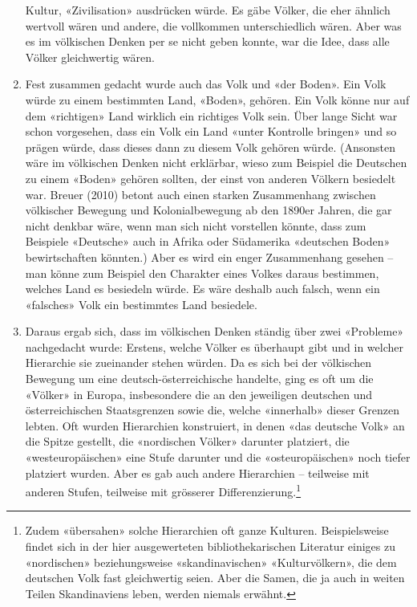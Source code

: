 \documentclass[a4paper,
fontsize=11pt,
oneside,
numbers=noperiodatend,
parskip=half-,
bibliography=totoc,
final
]{scrartcl}
\begin{document}
\begin{enumerate}
  Kultur, «Zivilisation» ausdrücken würde. Es gäbe Völker, die eher
  ähnlich wertvoll wären und andere, die vollkommen unterschiedlich
  wären. Aber was es im völkischen Denken per se nicht geben konnte, war
  die Idee, dass alle Völker gleichwertig wären.
\item
  Fest zusammen gedacht wurde auch das Volk und «der Boden». Ein Volk
  würde zu einem bestimmten Land, «Boden», gehören. Ein Volk könne nur
  auf dem «richtigen» Land wirklich ein richtiges Volk sein. Über lange
  Sicht war schon vorgesehen, dass ein Volk ein Land «unter Kontrolle
  bringen» und so prägen würde, dass dieses dann zu diesem Volk gehören
  würde. (Ansonsten wäre im völkischen Denken nicht erklärbar, wieso zum
  Beispiel die Deutschen zu einem «Boden» gehören sollten, der einst von
  anderen Völkern besiedelt war. Breuer (2010) betont auch einen starken
  Zusammenhang zwischen völkischer Bewegung und Kolonialbewegung ab den
  1890er Jahren, die gar nicht denkbar wäre, wenn man sich nicht
  vorstellen könnte, dass zum Beispiele «Deutsche» auch in Afrika oder
  Südamerika «deutschen Boden» bewirtschaften könnten.) Aber es wird ein
  enger Zusammenhang gesehen -- man könne zum Beispiel den Charakter
  eines Volkes daraus bestimmen, welches Land es besiedeln würde. Es
  wäre deshalb auch falsch, wenn ein «falsches» Volk ein bestimmtes Land
  besiedele.
\item
  Daraus ergab sich, dass im völkischen Denken ständig über zwei
  «Probleme» nachgedacht wurde: Erstens, welche Völker es überhaupt gibt
  und in welcher Hierarchie sie zueinander stehen würden. Da es sich bei
  der völkischen Bewegung um eine deutsch-österreichische handelte, ging
  es oft um die «Völker» in Europa, insbesondere die an den jeweiligen
  deutschen und österreichischen Staatsgrenzen sowie die, welche
  «innerhalb» dieser Grenzen lebten. Oft wurden Hierarchien konstruiert,
  in denen «das deutsche Volk» an die Spitze gestellt, die «nordischen
  Völker» darunter platziert, die «westeuropäischen» eine Stufe darunter
  und die «osteuropäischen» noch tiefer platziert wurden. Aber es gab
  auch andere Hierarchien -- teilweise mit anderen Stufen, teilweise mit
  grösserer Differenzierung.\footnote{Zudem «übersahen» solche
    Hierarchien oft ganze Kulturen. Beispielsweise findet sich in der
    hier ausgewerteten bibliothekarischen Literatur einiges zu
    «nordischen» beziehungsweise «skandinavischen» «Kulturvölkern», die
    dem deutschen Volk fast gleichwertig seien. Aber die Samen, die ja
    auch in weiten Teilen Skandinaviens leben, werden niemals erwähnt.
}
\end{enumerate}
\end{document}
